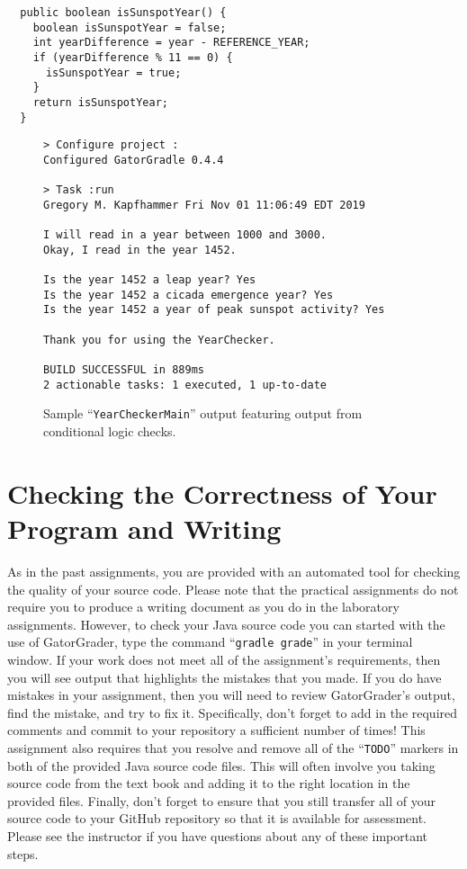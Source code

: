 \documentclass[11pt]{article}
\newcommand{\gatorgraderstart}{\command{gradle grade}}
\newcommand{\command}[1]{``\lstinline{#1}''}
\begin{document}
\vspace*{-.05in}
%
\begin{verbatim}
  public boolean isSunspotYear() {
    boolean isSunspotYear = false;
    int yearDifference = year - REFERENCE_YEAR;
    if (yearDifference % 11 == 0) {
      isSunspotYear = true;
    }
    return isSunspotYear;
  }
\end{verbatim}
%
\vspace*{-.2in}

\begin{figure}[tb]
\begin{Verbatim}[commandchars=\\\{\}]
> Configure project :
Configured GatorGradle 0.4.4

> Task :run
Gregory M. Kapfhammer Fri Nov 01 11:06:49 EDT 2019

I will read in a year between 1000 and 3000.
Okay, I read in the year 1452.

Is the year 1452 a leap year? Yes
Is the year 1452 a cicada emergence year? Yes
Is the year 1452 a year of peak sunspot activity? Yes

Thank you for using the YearChecker.

BUILD SUCCESSFUL in 889ms
2 actionable tasks: 1 executed, 1 up-to-date
\end{Verbatim}
\vspace*{-.1in}
\caption{Sample ``{\tt YearCheckerMain}'' output featuring output from conditional logic checks.}
\label{mad}
\end{figure}

\section*{Checking the Correctness of Your Program and Writing}

As in the past assignments, you are provided with an automated tool for checking
the quality of your source code. Please note that the practical assignments do
not require you to produce a writing document as you do in the laboratory
assignments. However, to check your Java source code you can started with the
use of GatorGrader, type the command \gatorgraderstart{} in your terminal
window. If your work does not meet all of the assignment's requirements, then
you will see output that highlights the mistakes that you made. If you do have
mistakes in your assignment, then you will need to review GatorGrader's output,
find the mistake, and try to fix it. Specifically, don't forget to add in the
required comments and commit to your repository a sufficient number of times!
This assignment also requires that you resolve and remove all of the
\command{TODO} markers in both of the provided Java source code files. This will
often involve you taking source code from the text book and adding it to the
right location in the provided files. Finally, don't forget to ensure that you
still transfer all of your source code to your GitHub repository so that it is
available for assessment. Please see the instructor if you have questions about
any of these important steps.
\end{document}
